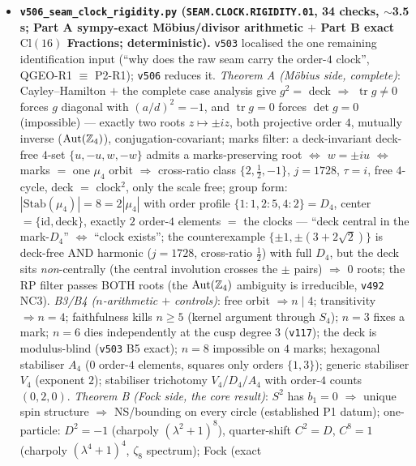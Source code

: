 \begin{itemize}[leftmargin=1.5em]
\item \textbf{\texttt{v506\_seam\_clock\_rigidity.py} (\texttt{SEAM.CLOCK.RIGIDITY.01}, 34 checks,
$\sim$3.5 s; Part A sympy-exact M\"obius/divisor arithmetic $+$ Part B exact $\mathrm{Cl}(16)$
Fractions; deterministic).} \texttt{v503} localised the one remaining identification input (``why
does the raw seam carry the order-$4$ clock'', QGEO-R1 $\equiv$ P2-R1); \texttt{v506} reduces it.
\emph{Theorem A (M\"obius side, complete)}: Cayley--Hamilton $+$ the complete case analysis give
$g^2=$ deck $\Rightarrow$ $\operatorname{tr}g\neq0$ forces $g$ diagonal with $(a/d)^2=-1$, and
$\operatorname{tr}g=0$ forces $\det g=0$ (impossible) --- exactly two roots $z\mapsto\pm iz$, both
projective order $4$, mutually inverse ($\operatorname{Aut}(\mathbb{Z}_4)$), conjugation-covariant;
marks filter: a deck-invariant deck-free $4$-set $\{u,-u,w,-w\}$ admits a marks-preserving root
$\iff$ $w=\pm iu$ $\iff$ marks $=$ one $\mu_4$ orbit $\Rightarrow$ cross-ratio class
$\{2,\tfrac12,-1\}$, $j=1728$, $\tau=i$, free $4$-cycle, deck $=$ clock$^2$, only the scale free;
group form: $|\mathrm{Stab}(\mu_4)|=8=2|\mu_4|$ with order profile $\{1{:}1,2{:}5,4{:}2\}=D_4$,
center $=\{\mathrm{id},\text{deck}\}$, exactly $2$ order-$4$ elements $=$ the clocks --- ``deck
central in the mark-$D_4$'' $\iff$ ``clock exists''; the counterexample $\{\pm1,\pm(3{+}2\sqrt2)\}$
is deck-free AND harmonic ($j=1728$, cross-ratio $\tfrac12$) with full $D_4$, but the deck sits
\emph{non}-centrally (the central involution crosses the $\pm$ pairs) $\Rightarrow$ $0$ roots; the
RP filter passes BOTH roots (the $\operatorname{Aut}(\mathbb{Z}_4)$ ambiguity is irreducible, \texttt{v492}
NC3). \emph{B3/B4 ($n$-arithmetic $+$ controls)}: free orbit $\Rightarrow n\mid4$; transitivity
$\Rightarrow n=4$; faithfulness kills $n\ge5$ (kernel argument through $S_4$); $n=3$ fixes a mark;
$n=6$ dies independently at the cusp degree $3$ (\texttt{v117}); the deck is modulus-blind
(\texttt{v503} B5 exact); $n=8$ impossible on $4$ marks; hexagonal stabiliser $A_4$ ($0$ order-$4$
elements, squares only orders $\{1,3\}$); generic stabiliser $V_4$ (exponent $2$); stabiliser
trichotomy $V_4/D_4/A_4$ with order-$4$ counts $(0,2,0)$. \emph{Theorem B (Fock side, the core
result)}: $S^2$ has $b_1=0$ $\Rightarrow$ unique spin structure $\Rightarrow$ NS/bounding on every
circle (established P1 datum); one-particle: $D^2=-1$ (charpoly $(\lambda^2{+}1)^8$), quarter-shift
$C^2=D$, $C^8=1$ (charpoly $(\lambda^4{+}1)^4$, $\zeta_8$ spectrum); Fock (exact

\end{itemize}
